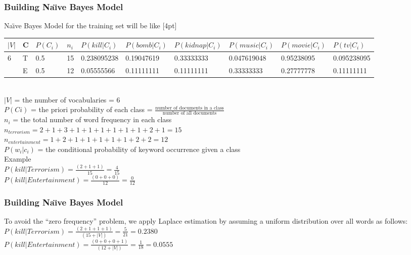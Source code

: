 \documentclass[serif,11pt,aspectratio=1610,table]{beamer}
\begin{document}
\begin{frame}[fragile]
 \frametitle{Building Na\"{\i}ve Bayes Model}
Na\"{\i}ve Bayes Model for the training set will be like
\tiny[4pt]
\begin{tabular}{|l|l|l|l|l|l|l|l|l|l|}
\hline
$|V|$&C & $P(C_{i})$ & $n_{i}$ & $P(kill|C_{i})$ & $P(bomb|C_{i})$ & $P(kidnap|C_{i})$ & $P(music|C_{i})$ & $P(movie|C_{i})$ & $P(tv|C_{i})$ \\ \hline
6 & T & 0.5 & 15 & 0.238095238 & 0.19047619 & 0.33333333 & 0.047619048 & 0.95238095 & 0.095238095 \\ \hline
 & E & 0.5 & 12 & 0.05555566 & 0.11111111 & 0.11111111 & 0.33333333 & 0.27777778 & 0.11111111 \\
\hline
\end{tabular}
\\
\normalsize
$|V|$ = the number of vocabularies = 6 \\
$P(C{i})$ = the priori probability of each class = $\frac{\text{number of documents in a class}}{\text{number of all documents}}$ \\
$n_{i}$ = the total number of word frequency in each class \\
$n_{terrorism} = 2+1+3+1+1+1+1+1+1+2+1 = 15$ \\
$n_{entertainment} = 1+2+1+1+1+1+1+2+2 = 12 $ \\
$P(w_{i} | c_{i})$ = the conditional probability of keyword occurrence given a class \\
Example \\
$P (kill | Terrorism) = \frac{(2 + 1 + 1)}{15} = \frac{4}{15}$ \\
$P (kill | Entertainment) = \frac{(0 + 0 + 0)}{ 12} = \frac{0}{12}$
\end{frame}

\begin{frame}[fragile]
 \frametitle{Building Na\"{\i}ve Bayes Model}
To avoid the “zero frequency” problem, we apply Laplace estimation by assuming a uniform distribution over all words as follows: \\
$P (kill | Terrorism) = \frac{(2 + 1 + 1 + 1)}{(15 + |V|)} = \frac{5}{21} = 0.2380 $ \\
$P (kill | Entertainment) = \frac{(0 + 0 + 0 + 1)}{(12 + |V|)} = \frac{1}{18} = 0.0555 $ \\
\end{frame}
\end{document}
